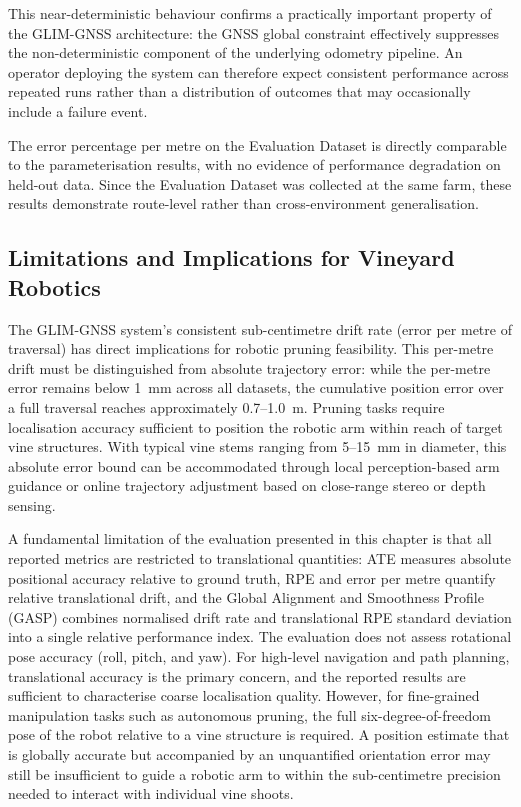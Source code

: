 This near-deterministic behaviour confirms a practically important property of the GLIM-GNSS architecture: the GNSS global constraint effectively suppresses the non-deterministic component of the underlying odometry pipeline. An operator deploying the system can therefore expect consistent performance across repeated runs rather than a distribution of outcomes that may occasionally include a failure event.

The error percentage per metre on the Evaluation Dataset is directly comparable to the parameterisation results, with no evidence of performance degradation on held-out data. Since the Evaluation Dataset was collected at the same farm, these results demonstrate route-level rather than cross-environment generalisation.

\subsection{Limitations and Implications for Vineyard Robotics}

The GLIM-GNSS system's consistent sub-centimetre drift rate (error per metre of traversal) has direct implications for robotic pruning feasibility. This per-metre drift must be distinguished from absolute trajectory error: while the per-metre error remains below 1~mm across all datasets, the cumulative position error over a full traversal reaches approximately 0.7--1.0~m. Pruning tasks require localisation accuracy sufficient to position the robotic arm within reach of target vine structures. With typical vine stems ranging from 5--15~mm in diameter, this absolute error bound can be accommodated through local perception-based arm guidance or online trajectory adjustment based on close-range stereo or depth sensing.

A fundamental limitation of the evaluation presented in this chapter is that all reported metrics are restricted to translational quantities: ATE measures absolute positional accuracy relative to ground truth, RPE and error per metre quantify relative translational drift, and the Global Alignment and Smoothness Profile (GASP) combines normalised drift rate and translational RPE standard deviation into a single relative performance index. The evaluation does not assess rotational pose accuracy (roll, pitch, and yaw). For high-level navigation and path planning, translational accuracy is the primary concern, and the reported results are sufficient to characterise coarse localisation quality. However, for fine-grained manipulation tasks such as autonomous pruning, the full six-degree-of-freedom pose of the robot relative to a vine structure is required. A position estimate that is globally accurate but accompanied by an unquantified orientation error may still be insufficient to guide a robotic arm to within the sub-centimetre precision needed to interact with individual vine shoots.

